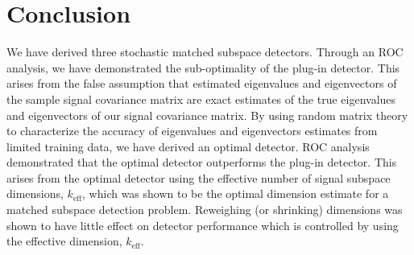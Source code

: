 \section{Conclusion}\label{sec:concl}
We have derived three stochastic matched subspace detectors. Through an ROC analysis, we have demonstrated the sub-optimality of the plug-in detector. This arises from the false assumption that estimated eigenvalues and eigenvectors of the sample signal covariance matrix are exact estimates of the true eigenvalues and eigenvectors of our signal covariance matrix. By using random matrix theory to characterize the accuracy of eigenvalues and eigenvectors estimates from limited training data, we have derived an optimal detector. ROC analysis demonstrated that the optimal detector outperforms the plug-in detector. This arises from the optimal detector using the effective number of signal subspace dimensions, $k_\text{eff}$, which was shown to be the optimal dimension estimate for a matched subspace detection problem. Reweighing (or shrinking) dimensions was shown to have little effect on detector performance which is controlled by using the effective dimension, $k_\text{eff}$.



%


%
